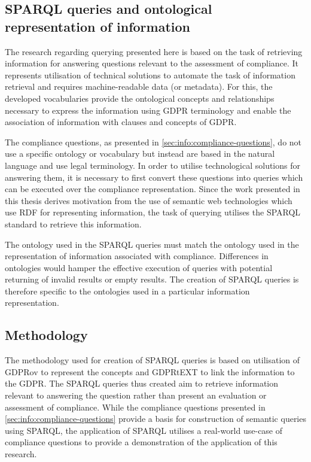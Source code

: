 \subsection{SPARQL queries and ontological representation of information}\label{sec:testing:sparql:relation}
The research regarding querying presented here is based on the task of retrieving information for answering questions relevant to the assessment of compliance.
It represents utilisation of technical solutions to automate the task of information retrieval and requires machine-readable data (or metadata).
For this, the developed vocabularies provide the ontological concepts and relationships necessary to express the information using GDPR terminology and enable the association of information with clauses and concepts of GDPR.

The compliance questions, as presented in \autoref{sec:info:compliance-questions}, do not use a specific ontology or vocabulary but instead are based in the natural language and use legal terminology. In order to utilise technological solutions for answering them, it is necessary to first convert these questions into queries which can be executed over the compliance representation.
Since the work presented in this thesis derives motivation from the use of semantic web technologies which use RDF for representing information, the task of querying utilises the SPARQL standard to retrieve this information.

The ontology used in the SPARQL queries must match the ontology used in the representation of information associated with compliance. Differences in ontologies would hamper the effective execution of queries with potential returning of invalid results or empty results.
The creation of SPARQL queries is therefore specific to the ontologies used in a particular information representation.

\subsection{Methodology}\label{sec:testing:sparql:methodology}
The methodology used for creation of SPARQL queries is based on utilisation of GDPRov to represent the concepts and GDPRtEXT to link the information to the GDPR.
The SPARQL queries thus created aim to retrieve information relevant to answering the question rather than present an evaluation or assessment of compliance.
While the compliance questions presented in \autoref{sec:info:compliance-questions} provide a basis for construction of semantic queries using SPARQL, the application of SPARQL utilises a real-world use-case of compliance questions to provide a demonstration of the application of this research.

